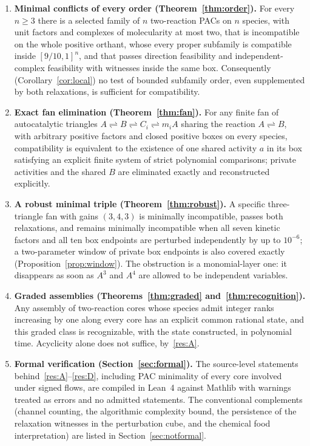 \documentclass[11pt,a4paper]{article}
\theoremstyle{plain}
\theoremstyle{definition}
\theoremstyle{remark}
\newcommand{\rev}{\rightleftharpoons}
\begin{document}
\begin{enumerate}[label=(\Alph*)]
\item\label{res:A} \textbf{Minimal conflicts of every order (Theorem~\ref{thm:order}).} For every $n\ge3$ there is a selected family of $n$ two-reaction PACs on $n$ species, with unit factors and complexes of molecularity at most two, that is incompatible on the whole positive orthant, whose every proper subfamily is compatible inside $[9/10,1]^n$, and that passes direction feasibility and independent-complex feasibility with witnesses inside the same box. Consequently (Corollary~\ref{cor:local}) no test of bounded subfamily order, even supplemented by both relaxations, is sufficient for compatibility.
\item\label{res:B} \textbf{Exact fan elimination (Theorem~\ref{thm:fan}).} For any finite fan of autocatalytic triangles $A\rev B\rev C_i\rev m_iA$ sharing the reaction $A\rev B$, with arbitrary positive factors and closed positive boxes on every species, compatibility is equivalent to the existence of one shared activity $a$ in its box satisfying an explicit finite system of strict polynomial comparisons; private activities and the shared $B$ are eliminated exactly and reconstructed explicitly.
\item\label{res:C} \textbf{A robust minimal triple (Theorem~\ref{thm:robust}).} A specific three-triangle fan with gains $(3,4,3)$ is minimally incompatible, passes both relaxations, and remains minimally incompatible when all seven kinetic factors and all ten box endpoints are perturbed independently by up to $10^{-6}$; a two-parameter window of private box endpoints is also covered exactly (Proposition~\ref{prop:window}). The obstruction is a monomial-layer one: it disappears as soon as $A^3$ and $A^4$ are allowed to be independent variables.
\item\label{res:D} \textbf{Graded assemblies (Theorems~\ref{thm:graded} and~\ref{thm:recognition}).} Any assembly of two-reaction cores whose species admit integer ranks increasing by one along every core has an explicit common rational state, and this graded class is recognizable, with the state constructed, in polynomial time. Acyclicity alone does not suffice, by~\ref{res:A}.
\item\label{res:E} \textbf{Formal verification (Section~\ref{sec:formal}).} The source-level statements behind~\ref{res:A}--\ref{res:D}, including PAC minimality of every core involved under signed flows, are compiled in Lean~4 \citep{demoura2021} against Mathlib \citep{mathlib2020} with warnings treated as errors and no admitted statements. The conventional complements (channel counting, the algorithmic complexity bound, the persistence of the relaxation witnesses in the perturbation cube, and the chemical food interpretation) are listed in Section~\ref{sec:notformal}.
\end{enumerate}
\end{document}
